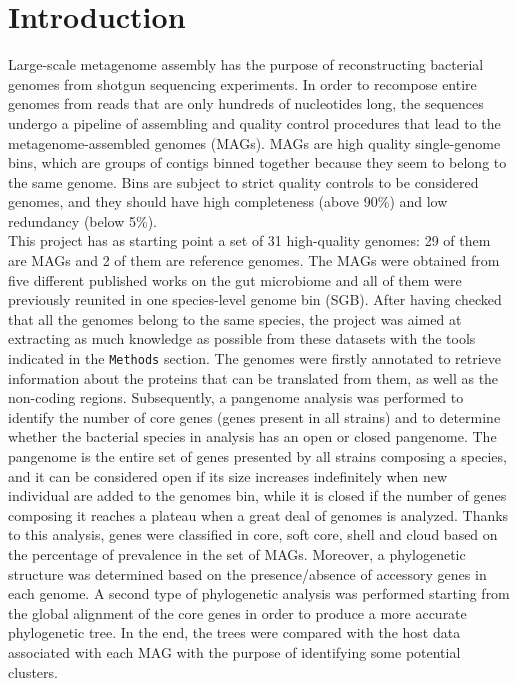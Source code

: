 \section*{Introduction}

Large-scale metagenome assembly has the purpose of reconstructing bacterial genomes from shotgun sequencing experiments. In order to recompose entire genomes from reads that are only hundreds of nucleotides long, the sequences undergo a pipeline of assembling and quality control procedures that lead to the metagenome-assembled genomes (MAGs). MAGs are high quality single-genome bins, which are groups of contigs binned together because they seem to belong to the same genome. Bins are subject to strict quality controls to be considered genomes, and they should have high completeness (above 90\%) and low redundancy (below 5\%).\\

This project has as starting point a set of 31 high-quality genomes: 29 of them are MAGs and 2 of them are reference genomes. The MAGs were obtained from five different published works on the gut microbiome \cite{origin1,origin2,origin3,origin4,origin5} and all of them were previously reunited in one species-level genome bin (SGB). After having checked that all the genomes belong to the same species, the project was aimed at extracting as much knowledge as possible from these datasets with the tools indicated in the \texttt{Methods} section. The genomes were firstly annotated to retrieve information about the proteins that can be translated from them, as well as the non-coding regions. Subsequently, a pangenome analysis was performed to identify the number of core genes (genes present in all strains) and to determine whether the bacterial species in analysis has an open or closed pangenome. The pangenome is the entire set of genes presented by all strains composing a species, and it can be considered open if its size increases indefinitely when new individual are added to the genomes bin, while it is closed if the number of genes composing it reaches a plateau when a great deal of genomes is analyzed. Thanks to this analysis, genes were classified in core, soft core, shell and cloud based on the percentage of prevalence in the set of MAGs. Moreover, a phylogenetic structure was determined based on the presence/absence of accessory genes in each genome. A second type of phylogenetic analysis was performed starting from the global alignment of the core genes in order to produce a more accurate phylogenetic tree. In the end, the trees were compared with the host data associated with each MAG with the purpose of identifying some potential clusters. 